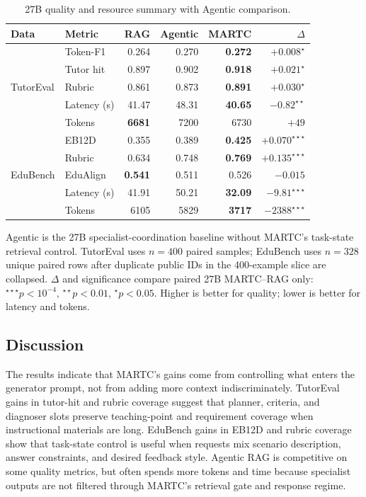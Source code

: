 \documentclass[letterpaper, 10 pt, conference]{ieeeconf}
\begin{document}
\begin{table}[t]
\caption{27B quality and resource summary with Agentic comparison.}
\label{tab:validation_27b}
\centering
\footnotesize
\setlength{\tabcolsep}{2.2pt}
\renewcommand{\arraystretch}{0.90}
\begin{tabular}{llrrrr}
\toprule
Data & Metric & RAG & Agentic & MARTC & $\Delta$ \\
\midrule
\multirow{5}{*}{TutorEval} & Token-F1 & 0.264 & 0.270 & \textbf{0.272} & $+0.008^{\star}$ \\
& Tutor hit & 0.897 & 0.902 & \textbf{0.918} & $+0.021^{\star}$ \\
& Rubric & 0.861 & 0.873 & \textbf{0.891} & $+0.030^{\star}$ \\
& Latency (s) & 41.47 & 48.31 & \textbf{40.65} & $-0.82^{\star\star}$ \\
& Tokens & \textbf{6681} & 7200 & 6730 & $+49$ \\
\midrule
\multirow{5}{*}{EduBench} & EB12D & 0.355 & 0.389 & \textbf{0.425} & $+0.070^{\star\star\star}$ \\
& Rubric & 0.634 & 0.748 & \textbf{0.769} & $+0.135^{\star\star\star}$ \\
& EduAlign & \textbf{0.541} & 0.511 & 0.526 & $-0.015$ \\
& Latency (s) & 41.91 & 50.21 & \textbf{32.09} & $-9.81^{\star\star\star}$ \\
& Tokens & 6105 & 5829 & \textbf{3717} & $-2388^{\star\star\star}$ \\
\bottomrule
\end{tabular}
\begin{minipage}{\columnwidth}\scriptsize\vspace{0.1em}Agentic is the 27B specialist-coordination baseline without MARTC's task-state retrieval control. TutorEval uses $n{=}400$ paired samples; EduBench uses $n{=}328$ unique paired rows after duplicate public IDs in the 400-example slice are collapsed. $\Delta$ and significance compare paired 27B MARTC--RAG only: $^{\star\star\star}p{<}10^{-4}$, $^{\star\star}p{<}0.01$, $^{\star}p{<}0.05$. Higher is better for quality; lower is better for latency and tokens.\end{minipage}
\end{table}

\subsection{Discussion}

The results indicate that MARTC's gains come from controlling what enters the generator prompt, not from adding more context indiscriminately. TutorEval gains in tutor-hit and rubric coverage suggest that planner, criteria, and diagnoser slots preserve teaching-point and requirement coverage when instructional materials are long. EduBench gains in EB12D and rubric coverage show that task-state control is useful when requests mix scenario description, answer constraints, and desired feedback style. Agentic RAG is competitive on some quality metrics, but often spends more tokens and time because specialist outputs are not filtered through MARTC's retrieval gate and response regime.
\end{document}
